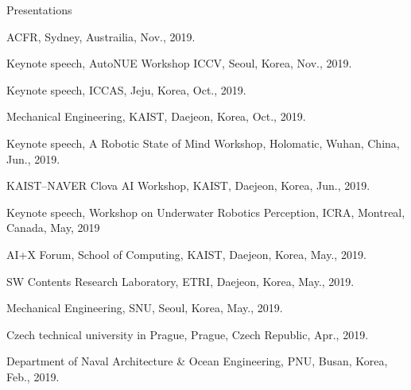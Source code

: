 \begin{rSection}{Presentations}

\begin{pubSubsectionNum}{}
  \item \ac{ACFR}, Sydney, Austrailia, Nov., 2019.

  \item Keynote speech, AutoNUE Workshop \ac{ICCV}, Seoul, Korea,  Nov., 2019.

  \item Keynote speech, \ac{ICCAS}, Jeju, Korea, Oct., 2019.

  \item Mechanical Engineering, \ac{KAIST}, Daejeon, Korea, Oct., 2019.

  \item Keynote speech, A Robotic State of Mind Workshop, Holomatic, Wuhan, China, Jun., 2019.

  \item KAIST--NAVER Clova AI Workshop, \ac{KAIST}, Daejeon, Korea, Jun., 2019.

  \item Keynote speech, Workshop on Underwater Robotics Perception, ICRA, Montreal, Canada, May, 2019

  \item AI+X Forum, School of Computing, \ac{KAIST}, Daejeon, Korea, May., 2019.

  \item SW Contents Research Laboratory, \ac{ETRI}, Daejeon, Korea, May., 2019.

  \item Mechanical Engineering, \ac{SNU}, Seoul, Korea, May., 2019.

  \item Czech technical university in Prague, Prague, Czech Republic, Apr., 2019.

  \item Department of Naval Architecture \& Ocean Engineering, \ac{PNU}, Busan, Korea, Feb., 2019.





\end{pubSubsectionNum}
\end{rSection}
